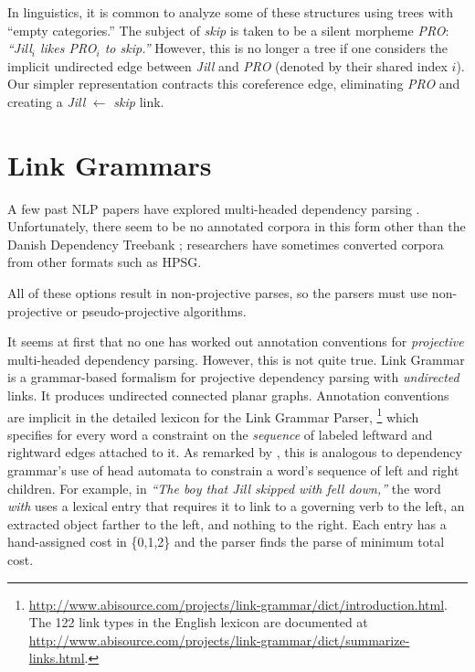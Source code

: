\documentclass[11pt]{article}
\newcommand{\Note}[4][]{\todo[author=#2,color=#3,fancyline,#1]{#4}}
\newcommand{\noteJE}[2][]{\Note[#1]{JE}{green!40}{#2}}
\newcommand{\NoteJE}[2][]{\noteJE[inline,#1]{#2}}
\begin{document}
In linguistics, it is common to analyze some of these structures using trees with ``empty categories.''  The subject of {\em skip} is taken to be a silent morpheme {\em PRO}:
{\em ``Jill$_i$ likes PRO$_i$ to skip.''}  However, this is no longer a tree if one considers the implicit undirected edge between {\em Jill} and {\em PRO} (denoted by their shared index $i$).  Our simpler representation contracts this coreference edge, eliminating {\em PRO} and creating a {\em Jill} $\leftarrow$ {\em skip} link.  

\section{Link Grammars}

A few past NLP papers have explored multi-headed dependency parsing \cite{buchkromann-2006,mcdonald-pereira-2006,sagae-tsujii-2008,gomezrodriguez-nivre-2013}.  Unfortunately, there seem to be no annotated corpora in this form other than the Danish Dependency Treebank \cite{kromann-2003}; researchers have sometimes converted corpora from other formats such as HPSG.  


All of these options result in non-projective parses, so the parsers must use non-projective or pseudo-projective algorithms.

It seems at first that no one has worked out annotation conventions for {\em projective} multi-headed dependency parsing.  However, this is not quite true.  Link Grammar \cite{SleatorTemperly91} is a grammar-based formalism for projective dependency parsing with {\em undirected} links.  It produces undirected connected planar graphs.  Annotation conventions are implicit in the detailed lexicon for the Link Grammar Parser,\noteJE{check caps}%
\footnote{\url{http://www.abisource.com/projects/link-grammar/dict/introduction.html}.  The 122 link types in the English lexicon are documented at \url{http://www.abisource.com/projects/link-grammar/dict/summarize-links.html}.} 
which specifies for every word a constraint on the {\em sequence} of labeled leftward and rightward edges attached to it.  As remarked by , this is analogous to dependency grammar's use of head automata to constrain a word's sequence of left and right children.  For example, in {\em ``The boy that Jill skipped with fell down,''} the word {\em with} uses a lexical entry that requires it to link to a governing verb to the left, an extracted object farther to the left, and nothing to the right.  Each entry has a hand-assigned cost in \{0,1,2\} and the parser finds the parse of minimum total cost.
\end{document}
